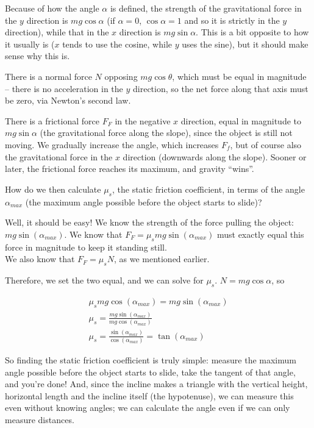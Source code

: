 Because of how the angle $\alpha$ is defined, the strength of the gravitational force in the $y$ direction is $m g \cos \alpha$ (if $\alpha = 0$, $\cos \alpha = 1$ and so it is strictly in the $y$ direction), while that in the $x$ direction is $m g \sin \alpha$. This is a bit opposite to how it usually is ($x$ tends to use the cosine, while $y$ uses the sine), but it should make sense why this is.

There is a normal force $N$ opposing $m g \cos \theta$, which must be equal in magnitude -- there is no acceleration in the $y$ direction, so the net force along that axis must be zero, via Newton's second law.

There is a frictional force $F_F$ in the negative $x$ direction, equal in magnitude to $m g \sin \alpha$ (the gravitational force along the slope), since the object is still not moving. We gradually increase the angle, which increases $F_f$, but of course also the gravitational force in the $x$ direction (downwards along the slope). Sooner or later, the frictional force reaches its maximum, and gravity ``wins''.

How do we then calculate $\mu_s$, the static friction coefficient, in terms of the angle $\alpha_{max}$ (the maximum angle possible before the object starts to slide)?

Well, it should be easy! We know the strength of the force pulling the object: $m g \sin (\alpha_{max})$. We know that $F_F = \mu_s m g \sin (\alpha_{max})$ must exactly equal this force in magnitude to keep it standing still.\\
We also know that $F_F = \mu_s N$, as we mentioned earlier.

Therefore, we set the two equal, and we can solve for $\mu_s$. $N = m g \cos \alpha$, so

\begin{align}
\mu_s m g \cos (\alpha_{max}) = m g \sin(\alpha_{max})\\
\mu_s = \frac{m g \sin(\alpha_{max})}{m g \cos (\alpha_{max})}\\
\mu_s = \frac{\sin(\alpha_{max})}{\cos (\alpha_{max})} = \tan(\alpha_{max})
\end{align}

So finding the static friction coefficient is truly simple: measure the maximum angle possible before the object starts to slide, take the tangent of that angle, and you're done! And, since the incline makes a triangle with the vertical height, horizontal length and the incline itself (the hypotenuse), we can measure this even without knowing angles; we can calculate the angle even if we can only measure distances.

